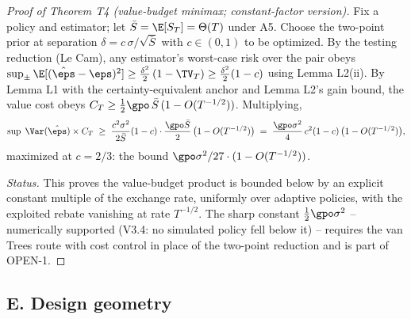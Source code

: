 \begin{proof}[Proof of Theorem T4 (value-budget minimax; constant-factor
version)]
Fix a policy and estimator; let $\bar S = \E[S_T] = \Theta(T)$ under A5.
Choose the two-point prior at separation $\delta = c\,\sigma/\sqrt{\bar S}$
with $c \in (0,1)$ to be optimized. By the testing reduction (Le Cam), any
estimator's worst-case risk over the pair obeys
$\sup_{\pm} \E[(\hat\eps - \eps)^2] \ge \tfrac{\delta^2}{2}\,(1 - \TV_T)
\ge \tfrac{\delta^2}{2}(1 - c)$ using Lemma L2(ii). By Lemma L1 with the
certainty-equivalent anchor and Lemma L2's gain bound, the value cost obeys
$C_T \ge \tfrac{1}{2}\gpo\,\bar S\,(1 - O(T^{-1/2}))$. Multiplying,
\[
\sup\; \Var(\hat\eps)\times C_T
 \;\ge\; \frac{c^2\sigma^2}{2\bar S}(1-c)\cdot
 \frac{\gpo \bar S}{2}\,\big(1 - O(T^{-1/2})\big)
 \;=\; \frac{\gpo\sigma^2}{4}\,c^2(1-c)\,\big(1 - O(T^{-1/2})\big),
\]
maximized at $c = 2/3$: the bound $\gpo\sigma^2/27 \cdot (1 - O(T^{-1/2}))$.

\emph{Status.} This proves the value-budget product is bounded below by an
explicit constant multiple of the exchange rate, uniformly over adaptive
policies, with the exploited rebate vanishing at rate $T^{-1/2}$. The
sharp constant $\tfrac{1}{2}\gpo\sigma^2$ -- numerically supported (V3.4:
no simulated policy fell below it) -- requires the van Trees route with
cost control in place of the two-point reduction and is part of OPEN-1.
\end{proof}

\subsection*{E. Design geometry}

